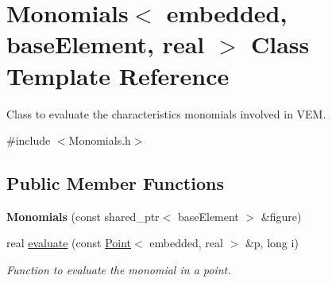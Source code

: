 \hypertarget{class_monomials}{\section{\-Monomials$<$ embedded, base\-Element, real $>$ \-Class \-Template \-Reference}
\label{class_monomials}
}


\-Class to evaluate the characteristics monomials involved in \-V\-E\-M.  




{\ttfamily \#include $<$\-Monomials.\-h$>$}

\subsection*{\-Public \-Member \-Functions}
\begin{DoxyCompactItemize}
\item 
\hypertarget{class_monomials_a212df6457fef6be449cfe3eb7d6db655}{{\bfseries \-Monomials} (const shared\-\_\-ptr$<$ base\-Element $>$ \&figure)}\label{class_monomials_a212df6457fef6be449cfe3eb7d6db655}

\item 
real \hyperlink{class_monomials_af0419328667c105b93cb65a7f4de2dd8}{evaluate} (const \hyperlink{class_point}{\-Point}$<$ embedded, real $>$ \&p, long i)
\begin{DoxyCompactList}\small\item\em \-Function to evaluate the monomial in a point. \end{DoxyCompactList}\end{DoxyCompactItemize}
